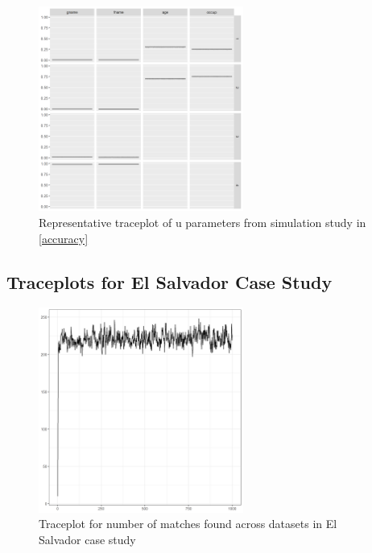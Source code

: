 \documentclass[12pt,letterpaper]{article}
\newcommand{\1}[1]{\mathbb{I}\!\left[#1\right]} %
\begin{document}
\begin{figure}[h]
	\begin{center}
		\includegraphics[width=0.6\textwidth]{../notes/figures/sim_u_trace} 
		\caption{Representative traceplot of u parameters from simulation study in \ref{accuracy}}\label{fig:sim_u_trace}
	\end{center}
\end{figure}

\hypertarget{appendix-es}{%
	\subsection{Traceplots for El Salvador Case Study}\label{app:appendix-es}}

\begin{figure}[h]
\begin{center}
\includegraphics[width=0.6\textwidth]{../notes/figures/el_salvador/overlap_trace} 
\caption{Traceplot for number of matches found across datasets in El Salvador case study}\label{fig:overlap_trace}
\end{center}
\end{figure}
\end{document}
